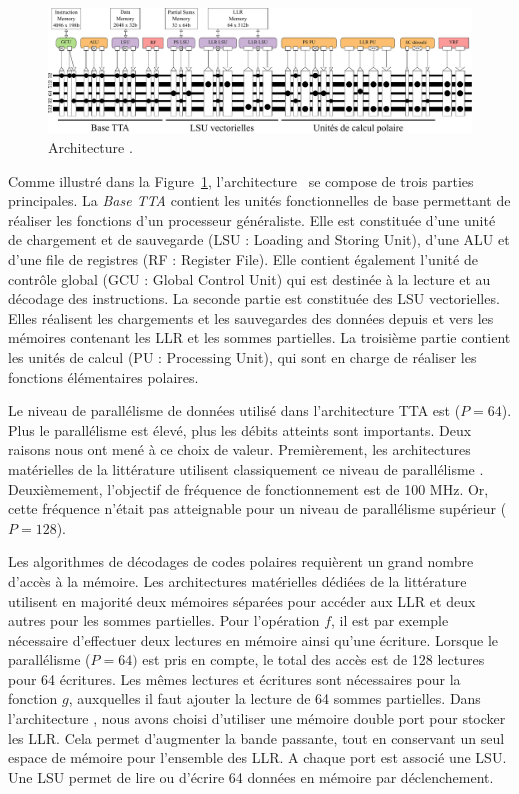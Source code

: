 \begin{figure}[t]
	\centering
	\includegraphics[width=\textwidth]{main/ch4_fig/archi_sc}
	\caption{Architecture \TTSC.}
	\label{fig:prode}
\end{figure}

Comme illustré dans la Figure~\ref{fig:prode}, l'architecture \TTSC~se compose de trois parties principales. La \textit{Base TTA} contient les unités fonctionnelles de base permettant de réaliser les fonctions d'un processeur généraliste. Elle est constituée d'une unité de chargement et de sauvegarde (LSU : Loading and Storing Unit), d'une ALU et d'une file de registres (RF : Register File). Elle contient également l'unité de contrôle global (GCU : Global Control Unit) qui est destinée à la lecture et au décodage des instructions. La seconde partie est constituée des LSU vectorielles. Elles réalisent les chargements et les sauvegardes des données depuis et vers les mémoires contenant les LLR et les sommes partielles.
La troisième partie contient les unités de calcul (PU : Processing Unit), qui sont en charge de réaliser les fonctions élémentaires polaires.

Le niveau de parallélisme de données utilisé dans l'architecture TTA est ($P=64$). Plus le parallélisme est élevé, plus les débits atteints sont importants. Deux raisons nous ont mené à ce choix de valeur. Premièrement, les architectures matérielles de la littérature utilisent classiquement ce niveau de parallélisme \cite{sarkis_fast_2014,giard_polarbear:_2017,mishra_successive_2012,giard_638_2015}. Deuxièmement, l'objectif de fréquence de fonctionnement est de 100 MHz. Or, cette fréquence n'était pas atteignable pour un niveau de parallélisme supérieur ($P=128$). 

Les algorithmes de décodages de codes polaires requièrent un grand nombre d'accès à la mémoire. Les architectures matérielles dédiées de la littérature utilisent en majorité deux mémoires séparées pour accéder aux LLR et deux autres pour les sommes partielles. Pour l'opération $f$, il est par exemple nécessaire d'effectuer deux lectures en mémoire ainsi qu'une écriture. Lorsque le parallélisme ($P=64)$ est pris en compte, le total des accès est de 128 lectures pour 64 écritures. Les mêmes lectures et écritures sont nécessaires pour la fonction $g$, auxquelles il faut ajouter la lecture de 64 sommes partielles. Dans l'architecture \TTSC, nous avons choisi d'utiliser une mémoire double port pour stocker les LLR. Cela permet d'augmenter la bande passante, tout en conservant un seul espace de mémoire pour l'ensemble des LLR. A chaque port est associé une LSU. Une LSU permet de lire ou d'écrire 64 données en mémoire par déclenchement.

